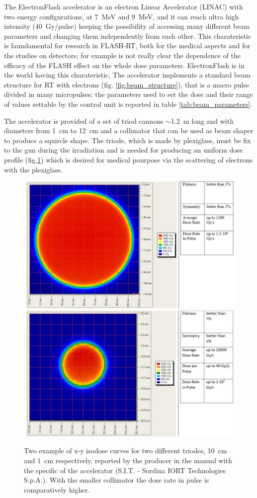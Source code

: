       The ElectronFlash accelerator is an electron Linear Accelerator (LINAC) with two energy configurations, at \SI{7}{MeV} and \SI{9}{MeV}, and it can reach ultra high intensity (\SI{40}{Gy/pulse}) keeping the possibility of accessing many different beam parameters and changing them independently from each other. This charateristic is faundamental for research in FLASH-RT, both for the medical aspects and for the studies on detectors; for example is not really clear the dependence of the efficacy of the FLASH effect on the whole dose parameters. ElectronFlash is  in the world having this charateristic,     
      The accelerator implements a standard beam structure for RT with electrons (fig. \ref{fig:beam_structure}), that is a macro pulse divided in many micropulses; the parameters used to set the dose and their range of values settable by the control unit is reported in table \ref{tab:beam_parameters}. 

      The accelerator is provided of a set of triod cannons $\sim$\SI{1.2}{m} long and with diameters from \SI{1}{cm} to \SI{12}{cm} and a collimator that can be used as beam shaper to produce a squircle shape.
      The triode, which is made by plexiglass, must be fix to the gun during the irradiation and is needed for producing an uniform dose profile (fig.\ref{fig:dose_profile}) which is desired for medical pourpose via the scattering of electrons with the plexiglass.
      \begin{figure}[h!]
         \centering
         \includegraphics[width=.49\linewidth]{figures/test_beam/dose_profile_10cm.pdf}
         \includegraphics[width=.49\linewidth]{figures/test_beam/dose_profile_1cm.pdf}
         \caption{Two example of x-y isodose curves for two different triodes, \SI{10}{cm} and \SI{1}{cm} respectively, reported by the producer in the manual with the specific of the accelerator (S.I.T. - Sordina IORT Technologies S.p.A.). With the smaller collimator the dose rate in pulse is comparatively higher.}
         \label{fig:dose_profile}
      \end{figure}  

